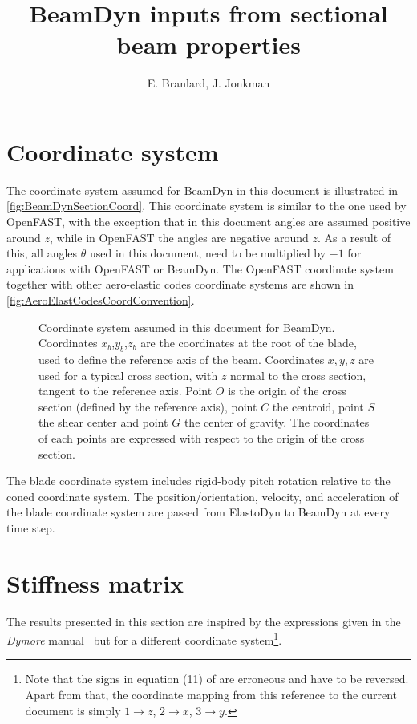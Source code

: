 \documentclass[11pt]{article}
\newcommand{\svgtex}[4]{\begin{figure}[!htb]%
 \centering%
 \def\svgwidth{#3\columnwidth}%
 \scalebox{#4}{{#1}}%
 \caption{#2}\label{fig:#1}%
 \end{figure}%
}
\begin{document}
\title{BeamDyn inputs from sectional beam properties}
\author{E. Branlard, J. Jonkman}
\maketitle


\section{Coordinate system}
The coordinate system assumed for BeamDyn in this document is illustrated in \autoref{fig:BeamDynSectionCoord}. 
This coordinate system is similar to the one used by OpenFAST, with the exception that in this document angles are assumed positive around $z$, while in OpenFAST the angles are negative around $z$. As a result of this, all angles $\theta$ used in this document, need to be multiplied by $-1$ for applications with OpenFAST or BeamDyn. The OpenFAST coordinate system together with other aero-elastic codes coordinate systems are shown in  \autoref{fig:AeroElastCodesCoordConvention}.
% 
\svgtex{BeamDynSectionCoord}{Coordinate system assumed in this document for BeamDyn. Coordinates $x_b$,$y_b$,$z_b$ are the coordinates at the root of the blade, used to define the reference axis of the beam. Coordinates $x,y,z$ are used for a typical cross section, with $z$ normal to the cross section, tangent to the reference axis. Point $O$ is the origin of the cross section (defined by the reference axis), point $C$ the centroid, point $S$ the shear center and point $G$ the center of gravity. The coordinates of each points are expressed with respect to the origin of the cross section.}{1.0}{0.90}
The blade coordinate system includes rigid-body pitch rotation relative to the coned coordinate system.
The position/orientation, velocity, and acceleration of the blade coordinate system are passed from ElastoDyn to BeamDyn at every time step.


\section{Stiffness matrix}
The results presented in this section are inspired by the expressions given in the \textit{Dymore} manual~\cite{dymore} but for a different coordinate system\footnote{Note that the signs in equation (11) of \cite{dymore} are erroneous and have to be reversed. Apart from that, the coordinate mapping from this reference to the current document is simply $1\to z$, $2\to x$, $3\to y$.}.
\end{document}
